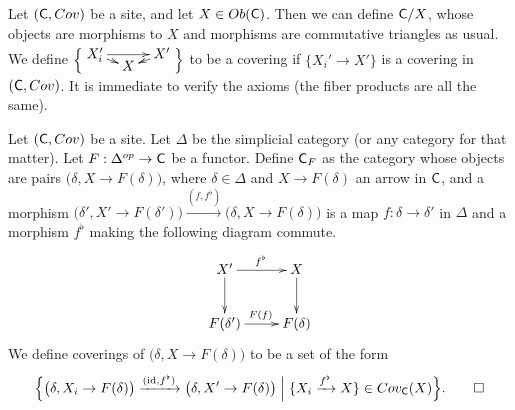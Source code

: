 \begin{example} \label{lec02Eg:comma_sites}
 Let $(\text{\sf C},Cov)$ be a site, and let $X\in Ob(\text{\sf C})$. Then we can define $\text{\sf C}/X$, whose objects are morphisms to $X$ and morphisms are commutative triangles as usual. We define $\Bigl\{ \raisebox{1ex}{$\xymatrix@!0 @R=2ex @C=2pc{X_i'\ar[dr]\ar[rr]& & X'\ar[dl]\\ & X}$} \Bigr\}$ to be a covering if $\{X_i'\to X'\}$ is a covering in $(\text{\sf C},Cov)$. It is immediate to verify the axioms (the fiber products are all the same).
\end{example}
\begin{example} \label{lec02Eg:over_sites}
 Let $(\text{\sf C},Cov)$ be a site. Let $\Delta$ be the simplicial category (or any category for that matter). Let $F:\Delta^{op}\to \text{\sf C}$ be a functor. Define $\text{\sf C}_F$ as the category whose objects are pairs $\bigl(\delta, X\to F(\delta)\bigr)$, where $\delta\in \Delta$ and $X\to F(\delta)$ an arrow in $\text{\sf C}$, and a morphism $\bigl(\delta',X'\to F(\delta')\bigr)\xrightarrow{(f,f^\flat)} \bigl(\delta,X\to F(\delta)\bigr)$ is a map $f:\delta\to \delta'$ in $\Delta$ and a morphism $f^\flat$ making the following diagram commute.
 \[\xymatrix{
   X'\ar[d] \ar[r]^{f^\flat} & X \ar[d]\\
   F(\delta') \ar[r]^{F(f)} & F(\delta)
 }\]
 We define coverings of $\bigl(\delta,X\to F(\delta)\bigr)$ to be a set of the form
 \[
 \Bigl\{\bigl(\delta,X_i\to
 F(\delta)\bigr)\xrightarrow{(\operatorname{id},f^\flat)}\bigl(\delta,X'\to
 F(\delta)\bigr)\Bigm|\{X_i\xrightarrow{f^\flat} X\}\in Cov_{\text{\sf C}}(X)\Bigr\}.
 \qedhere
 \]
\end{example}
